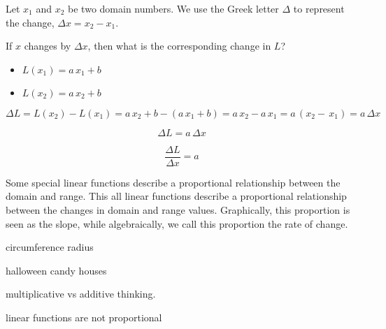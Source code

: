 \documentclass{ximera}
\begin{document}
Let $x_1$ and $x_2$ be two domain numbers.  We use the Greek letter $\Delta$ to represent the change, $\Delta x = x_2 - x_1$.


If $x$ changes by $\Delta x$, then what is the corresponding change in $L$?


\begin{itemize}
\item $L(x_1) = a \, x_1 + b$
\item $L(x_2) = a \, x_2 + b$
\end{itemize}


\[
\Delta L = L(x_2) - L(x_1) = a \, x_2 + b - (a \, x_1 + b) = a \, x_2  - a \, x_1  = a \, (x_2  -  \, x_1) = a \, \Delta x
\]



\[
\Delta L =  a \, \Delta x
\]


\[
\frac{\Delta L}{\Delta x} = a
\]




Some special linear functions describe a proportional relationship between the domain and range.  This all linear functions describe a proportional relationship between the changes in domain and range values. Graphically, this proportion is seen as the slope, while algebraically, we call this proportion the rate of change.

























circumference radius

halloween candy houses

multiplicative vs additive thinking.

linear functions are not proportional
\end{document}
